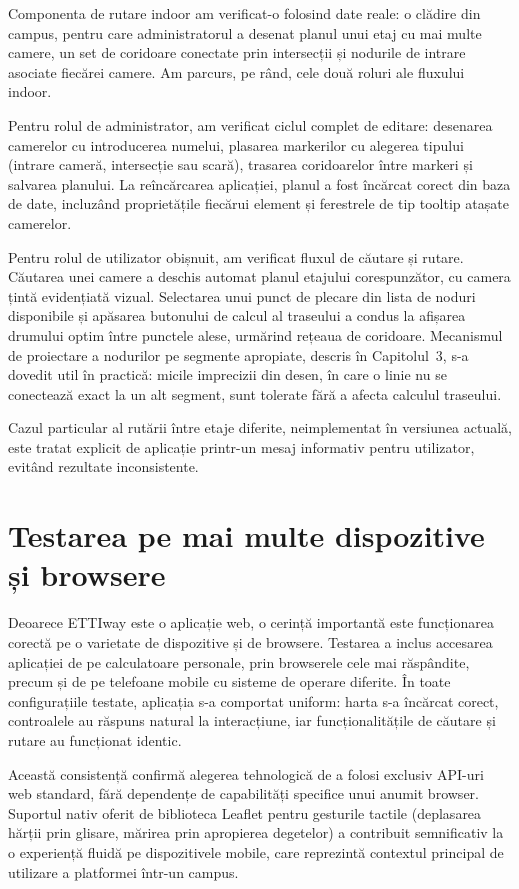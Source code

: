 Componenta de rutare indoor am verificat-o folosind date reale: o clădire
din campus, pentru care administratorul a desenat planul unui etaj cu mai multe
camere, un set de coridoare conectate prin intersecții și nodurile de intrare
asociate fiecărei camere. Am parcurs, pe rând, cele două roluri ale
fluxului indoor.

Pentru rolul de administrator, am verificat ciclul complet de editare:
desenarea camerelor cu introducerea numelui, plasarea markerilor cu alegerea
tipului (intrare cameră, intersecție sau scară), trasarea coridoarelor între
markeri și salvarea planului. La reîncărcarea aplicației, planul a fost
încărcat corect din baza de date, incluzând proprietățile fiecărui element și
ferestrele de tip tooltip atașate camerelor.

Pentru rolul de utilizator obișnuit, am verificat fluxul de căutare și
rutare. Căutarea unei camere a deschis automat planul etajului corespunzător,
cu camera țintă evidențiată vizual. Selectarea unui punct de plecare din
lista de noduri disponibile și apăsarea butonului de calcul al traseului a
condus la afișarea drumului optim între punctele alese, urmărind rețeaua de
coridoare. Mecanismul de proiectare a nodurilor pe segmente apropiate, descris
în Capitolul~3, s-a dovedit util în practică: micile imprecizii din desen, în
care o linie nu se conectează exact la un alt segment, sunt tolerate fără a
afecta calculul traseului.

Cazul particular al rutării între etaje diferite, neimplementat în versiunea
actuală, este tratat explicit de aplicație printr-un mesaj informativ pentru
utilizator, evitând rezultate inconsistente.

\section{Testarea pe mai multe dispozitive și browsere}
\label{sec:portabilitate}

Deoarece ETTIway este o aplicație web, o cerință importantă este funcționarea
corectă pe o varietate de dispozitive și de browsere. Testarea a inclus accesarea
aplicației de pe calculatoare personale, prin browserele cele mai răspândite,
precum și de pe telefoane mobile cu sisteme de operare diferite. În toate
configurațiile testate, aplicația s-a comportat uniform: harta s-a încărcat
corect, controalele au răspuns natural la interacțiune, iar funcționalitățile de
căutare și rutare au funcționat identic.

Această consistență confirmă alegerea tehnologică de a folosi exclusiv API-uri
web standard, fără dependențe de capabilități specifice unui anumit browser.
Suportul nativ oferit de biblioteca Leaflet pentru gesturile tactile
(deplasarea hărții prin glisare, mărirea prin apropierea degetelor) a contribuit
semnificativ la o experiență fluidă pe dispozitivele mobile, care reprezintă
contextul principal de utilizare a platformei într-un campus.

